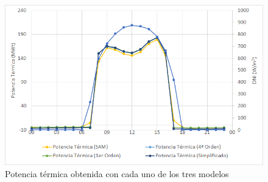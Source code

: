 \begin{figure}[h!]
\includegraphics[width=0.9\linewidth]{images/potencias_modelos.png}
\caption{Potencia térmica obtenida con cada uno de los tres modelos} 
\label{fig:potencia_modelos}
\end{figure}


